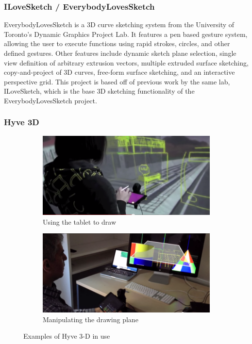 \documentclass{article}
\begin{document}
\subsubsection{ILoveSketch / EverybodyLovesSketch}

EverybodyLovesSketch is a 3D curve sketching system from the University of Toronto's Dynamic Graphics Project Lab. It features a pen based gesture system, allowing the user to execute functions using rapid strokes, circles, and other defined gestures. Other features include dynamic sketch plane selection, single view definition of arbitrary extrusion vectors, multiple extruded surface sketching, copy-and-project of 3D curves, free-form surface sketching, and an interactive perspective grid. This project is based off of previous work by the same lab, ILoveSketch, which is the base 3D sketching functionality of the EverybodyLovesSketch project.

\subsubsection{Hyve 3D}

\begin{figure}

\begin{subfigure}{\textwidth}
\includegraphics[width=0.9\linewidth]{Hyve3D1}
\caption{Using the tablet to draw}
\end{subfigure}
\begin{subfigure}{\textwidth}
\includegraphics[width=0.9\linewidth]{Hyve3D2}
\caption{Manipulating the drawing plane}
\end{subfigure}

\caption{Examples of Hyve 3-D in use}
\end{figure}
\end{document}
